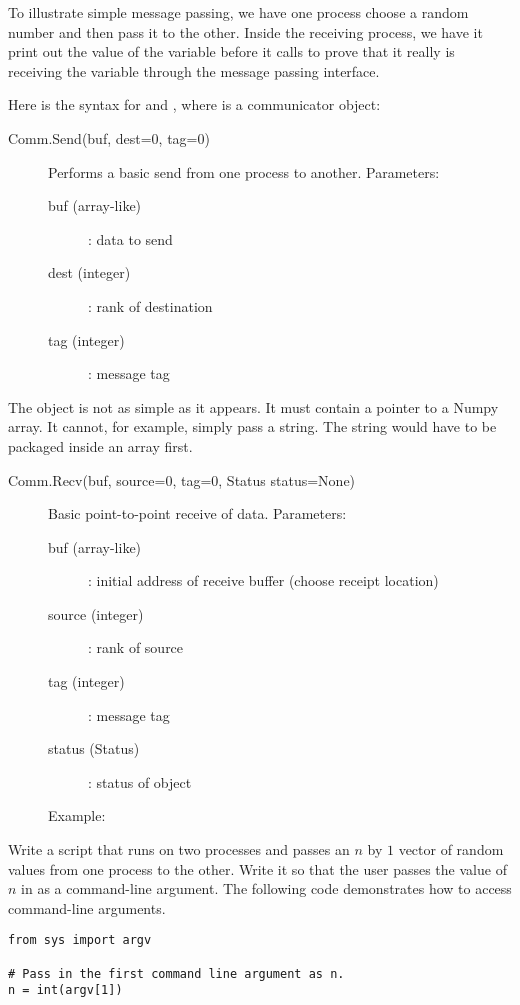 

To illustrate simple message passing, we have one process choose a random number and then pass it to the other.
Inside the receiving process, we have it print out the value of the variable  before it calls  to prove that it really is receiving the variable through the message passing interface.

Here is the syntax for  and , where  is a communicator object:

\begin{description}
\item[Comm.Send(buf, dest=0, tag=0)]
Performs a basic send from one process to another.
Parameters:
\begin{description}
\item[buf (array-like)]: data to send
\item[dest (integer)]: rank of destination
\item[tag (integer)]: message tag
\end{description}
\end{description}

The  object is not as simple as it appears. It must contain a pointer to a Numpy array. It cannot, for example, simply pass a string.
The string would have to be packaged inside an array first.

\begin{description}
\item[Comm.Recv(buf, source=0, tag=0, Status status=None)]
Basic point-to-point receive of data.
Parameters:
\begin{description}
\item[buf (array-like)]: initial address of receive buffer (choose receipt location)
\item[source (integer)]: rank of source
\item[tag (integer)]: message tag
\item[status (Status)]: status of object
\end{description}
Example:

\end{description}

\begin{problem}
Write a script that runs on two processes and passes an $n$ by $1$ vector of random values from one process to the other.
Write it so that the user passes the value of $n$ in as a command-line argument.
The following code demonstrates how to access command-line arguments.
\begin{lstlisting}
from sys import argv

# Pass in the first command line argument as n.
n = int(argv[1])
\end{lstlisting}
\end{problem}


